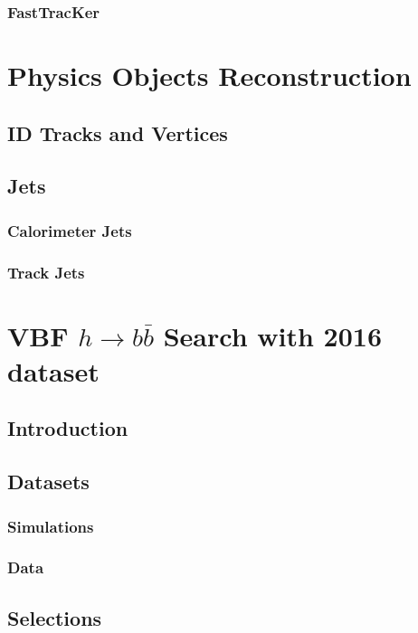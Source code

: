 \documentclass{report}
\begin{document}
\subsection{FastTracKer}

\chapter{Physics Objects Reconstruction}
\label{chap:reconstruction}
\section{ID Tracks and Vertices}
\section{Jets}
\subsection{Calorimeter Jets}
\subsection{Track Jets}

\chapter{VBF $h\rightarrow b\bar{b}$ Search with 2016 dataset}
\label{chap:vbf}
\section{Introduction}


\section{Datasets}
\subsection{Simulations}

\subsection{Data}


\section{Selections}
\end{document}
